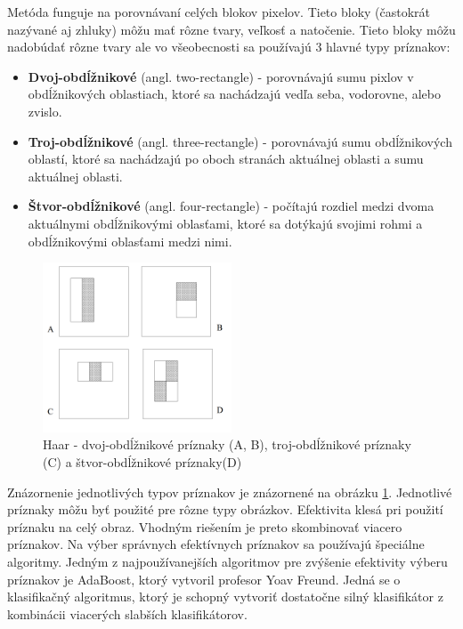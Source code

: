 \documentclass[slovak,master,dept460,male,cpp,cpdeclaration]{diploma}
\begin{document}
 Metóda funguje na porovnávaní celých blokov pixelov. Tieto bloky (častokrát nazývané aj zhluky) môžu mať rôzne tvary, veľkosť a natočenie. Tieto bloky môžu nadobúdať rôzne tvary ale vo všeobecnosti sa používajú 3 hlavné typy príznakov:
\begin{itemize}
  \item \textbf{Dvoj-obdĺžnikové} (angl. two-rectangle) - porovnávajú sumu pixlov v obdĺžnikových oblastiach, ktoré sa nachádzajú vedľa seba, vodorovne, alebo zvislo.
  \item \textbf{Troj-obdĺžnikové} (angl. three-rectangle) - porovnávajú sumu obdĺžnikových oblastí, ktoré sa nachádzajú po oboch stranách aktuálnej oblasti a sumu aktuálnej oblasti.
  \item \textbf{Štvor-obdĺžnikové} (angl. four-rectangle) - počítajú rozdiel medzi dvoma aktuálnymi obdĺžnikovými oblasťami, ktoré sa dotýkajú svojimi rohmi a obdĺžnikovými oblasťami medzi nimi.  
\end{itemize}
   \begin{figure}[H]
	\centering
	\includegraphics[width=0.5\textwidth]{Figures/haar1.png}
	\caption{Haar - dvoj-obdĺžnikové príznaky (A, B), troj-obdĺžnikové príznaky (C) a štvor-obdĺžnikové príznaky(D)\cite{viola2001robust}}
	\label{fig:Haar1}
\end{figure}
  Znázornenie jednotlivých typov príznakov je znázornené na obrázku \ref{fig:Haar1}. Jednotlivé príznaky môžu byť použité pre rôzne typy obrázkov. Efektivita klesá pri použití príznaku na celý obraz. Vhodným riešením je preto skombinovať viacero príznakov. Na výber  správnych efektívnych príznakov sa používajú špeciálne algoritmy. Jedným z najpoužívanejších algoritmov  pre zvýšenie efektivity výberu príznakov je AdaBoost\cite{freund1995desicion}, ktorý vytvoril profesor Yoav Freund. Jedná se o klasifikačný algoritmus, ktorý je schopný vytvoriť dostatočne silný klasifikátor z kombinácii viacerých slabších klasifikátorov. 
\end{document}
